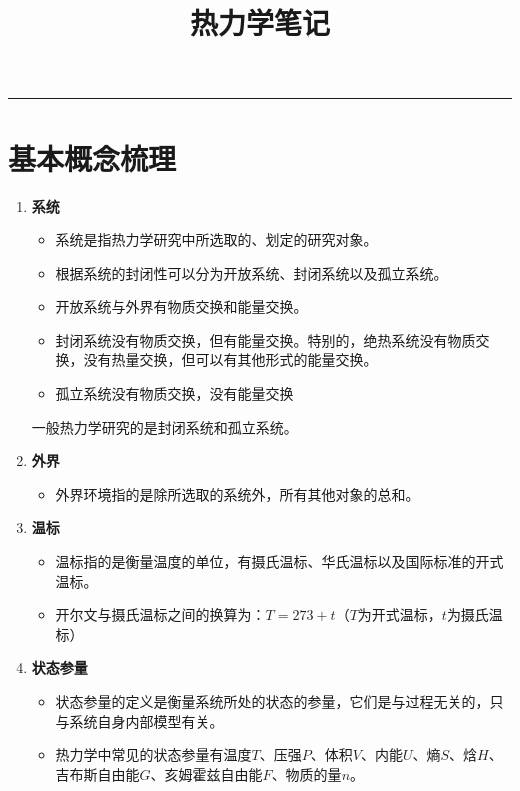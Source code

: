 \documentclass{article}
\title{\textbf{热力学笔记}}
\author{}
\date{}
\begin{document}
	
		\maketitle
	
	\tableofcontents
	\vspace{1cm}
	\hrule  %
	\vspace{1cm}
	
	\pagebreak
	
	
	\section{基本概念梳理}
	\begin{enumerate}[label=\arabic*.]
		\item \textbf{系统}
		\begin{itemize}
			\item 系统是指热力学研究中所选取的、划定的研究对象。
			\item 根据系统的封闭性可以分为开放系统、封闭系统以及孤立系统。
			\item 开放系统与外界有物质交换和能量交换。
			\item 封闭系统没有物质交换，但有能量交换。特别的，绝热系统没有物质交换，没有热量交换，但可以有其他形式的能量交换。
			\item 孤立系统没有物质交换，没有能量交换
		\end{itemize}
		一般热力学研究的是封闭系统和孤立系统。
		
		\item \textbf{外界}
		\begin{itemize}
			\item 外界环境指的是除所选取的系统外，所有其他对象的总和。
		\end{itemize}
		
		\item \textbf{温标}
		\begin{itemize}
			\item 温标指的是衡量温度的单位，有摄氏温标、华氏温标以及国际标准的开式温标。
			\item 开尔文与摄氏温标之间的换算为：\(T = 273 + t\)（\(T\)为开式温标，\(t\)为摄氏温标）
		\end{itemize}
		
		\item \textbf{状态参量}
		\begin{itemize}
			\item 状态参量的定义是衡量系统所处的状态的参量，它们是与过程无关的，只与系统自身内部模型有关。
			\item 热力学中常见的状态参量有温度\(T\)、压强\(P\)、体积\(V\)、内能\(U\)、熵\(S\)、焓\(H\)、吉布斯自由能\(G\)、亥姆霍兹自由能\(F\)、物质的量\(n\)。
		\end{itemize}
		

\end{enumerate}
\end{document}
